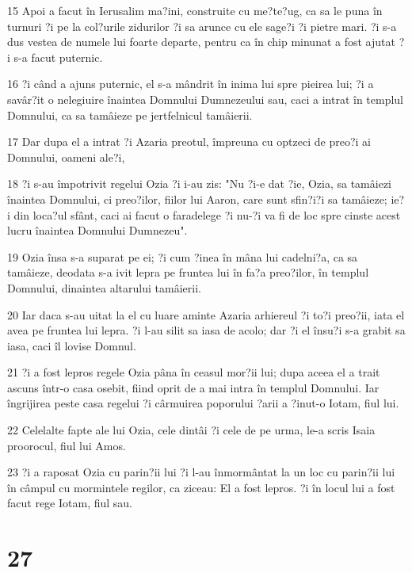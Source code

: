 \par 15 Apoi a facut în Ierusalim ma?ini, construite cu me?te?ug, ca sa le puna în turnuri ?i pe la col?urile zidurilor ?i sa arunce cu ele sage?i ?i pietre mari. ?i s-a dus vestea de numele lui foarte departe, pentru ca în chip minunat a fost ajutat ?i s-a facut puternic.
\par 16 ?i când a ajuns puternic, el s-a mândrit în inima lui spre pieirea lui; ?i a savâr?it o nelegiuire înaintea Domnului Dumnezeului sau, caci a intrat în templul Domnului, ca sa tamâieze pe jertfelnicul tamâierii.
\par 17 Dar dupa el a intrat ?i Azaria preotul, împreuna cu optzeci de preo?i ai Domnului, oameni ale?i,
\par 18 ?i s-au împotrivit regelui Ozia ?i i-au zis: "Nu ?i-e dat ?ie, Ozia, sa tamâiezi înaintea Domnului, ci preo?ilor, fiilor lui Aaron, care sunt sfin?i?i sa tamâieze; ie?i din loca?ul sfânt, caci ai facut o faradelege ?i nu-?i va fi de loc spre cinste acest lucru înaintea Domnului Dumnezeu".
\par 19 Ozia însa s-a suparat pe ei; ?i cum ?inea în mâna lui cadelni?a, ca sa tamâieze, deodata s-a ivit lepra pe fruntea lui în fa?a preo?ilor, în templul Domnului, dinaintea altarului tamâierii.
\par 20 Iar daca s-au uitat la el cu luare aminte Azaria arhiereul ?i to?i preo?ii, iata el avea pe fruntea lui lepra. ?i l-au silit sa iasa de acolo; dar ?i el însu?i s-a grabit sa iasa, caci îl lovise Domnul.
\par 21 ?i a fost lepros regele Ozia pâna în ceasul mor?ii lui; dupa aceea el a trait ascuns într-o casa osebit, fiind oprit de a mai intra în templul Domnului. Iar îngrijirea peste casa regelui ?i cârmuirea poporului ?arii a ?inut-o Iotam, fiul lui.
\par 22 Celelalte fapte ale lui Ozia, cele dintâi ?i cele de pe urma, le-a scris Isaia proorocul, fiul lui Amos.
\par 23 ?i a raposat Ozia cu parin?ii lui ?i l-au înmormântat la un loc cu parin?ii lui în câmpul cu mormintele regilor, ca ziceau: El a fost lepros. ?i în locul lui a fost facut rege Iotam, fiul sau.

\chapter{27}

